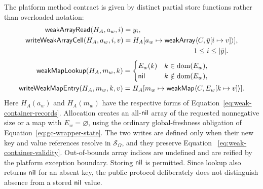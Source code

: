 The platform method contract is given by distinct partial store functions
rather than overloaded notation:
\begin{equation}\label{eq:weak-array-operations}
\begin{aligned}
 \mathsf{weakArrayRead}(H_A,a_w,i)&=y_i,\\
 \mathsf{writeWeakArrayCell}(H_A,a_w,i,v)
   &=H_A[a_w\mapsto
       \kw{weakArray}\langle C,\bar y[i\mapsto v]\rangle],\\
 &\hspace{35mm}1\le i\le |\bar y|.
\end{aligned}
\end{equation}
\begin{equation}\label{eq:weak-map-operations}
\begin{aligned}
 \mathsf{weakMapLookup}(H_A,m_w,k)&=
   \begin{cases}E_w(k)&k\in\mathop{\mathrm{dom}}(E_w),\\ \mathsf{nil}&k\notin\mathop{\mathrm{dom}}(E_w),\end{cases}\\
 \mathsf{writeWeakMapEntry}(H_A,m_w,k,v)
   &=H_A[m_w\mapsto\mathsf{weakMap}\langle C,E_w[k\mapsto v]\rangle].
\end{aligned}
\end{equation}
Here $H_A(a_w)$ and $H_A(m_w)$ have the respective forms of
Equation~\eqref{eq:weak-container-records}.  Allocation creates an all-$\mathsf{nil}$
array of the requested nonnegative size or a map with $E_w=\varnothing$, using
the ordinary global-freshness obligation of Equation~\eqref{eq:gc-wrapper-state}.
The two writes are defined only when their new key and value references resolve
in $\mathcal S_\Omega$, and they preserve Equation~
\eqref{eq:weak-container-validity}.
Out-of-bounds array indices are undefined and are reified by the platform
exception boundary.  Storing $\mathsf{nil}$ is permitted.  Since lookup also returns
$\mathsf{nil}$ for an absent key, the public  protocol deliberately does
not distinguish absence from a stored $\mathsf{nil}$ value.

